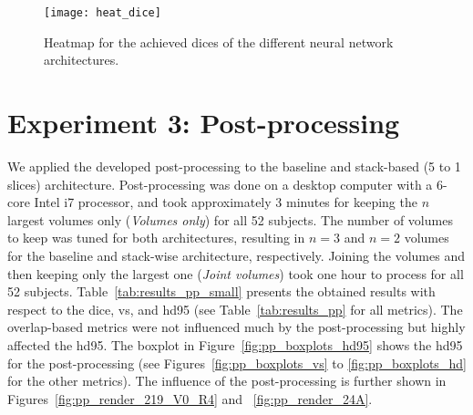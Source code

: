 \begin{figure}[htbp]	
	\centering
	\texttt{[image: heat\_dice]}
    \caption[Heatmap for the \glsdesc{dice} for 3-D Context]{Heatmap for the achieved \acrlong{dice}s of the different neural network architectures.}
    \label{fig:results_heatmap_dice}
\end{figure}


\section{Experiment 3: Post-processing} \label{sec:exp_pp} %
We applied the developed post-processing to the baseline and stack-based (5 to 1 slices) architecture. Post-processing was done on a desktop computer with a 6-core Intel i7 processor, and took approximately 3 minutes for keeping the $n$ largest volumes only (\textit{Volumes only}) for all 52 subjects. The number of volumes to keep was tuned for both architectures, resulting in $n = 3$ and $n = 2$ volumes for the baseline and stack-wise architecture, respectively. Joining the volumes and then keeping only the largest one (\textit{Joint volumes}) took one hour to process for all 52 subjects. Table~\ref{tab:results_pp_small} presents the obtained results with respect to the \acrlong{dice}, \acrlong{vs}, and \acrlong{hd95} (see Table~\ref{tab:results_pp} for all metrics). The overlap-based metrics were not influenced much by the post-processing but highly affected the \gls{hd95}. The boxplot in Figure~\ref{fig:pp_boxplots_hd95} shows the \acrlong{hd95} for the post-processing (see Figures~\ref{fig:pp_boxplots_vs} to \ref{fig:pp_boxplots_hd} for the other metrics). The influence of the post-processing is further shown in Figures~\ref{fig:pp_render_219_V0_R4} and ~\ref{fig:pp_render_24A}.

